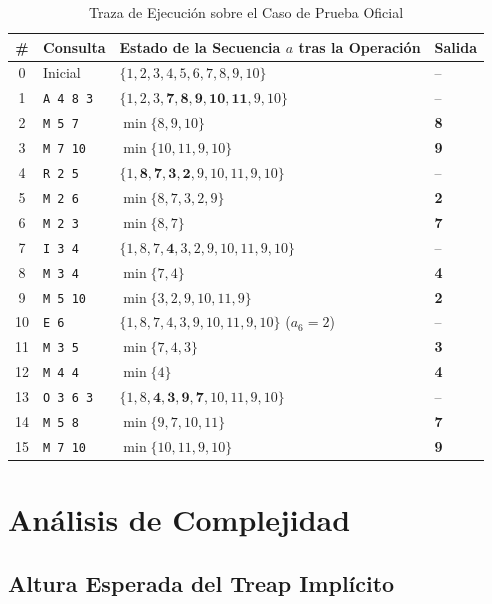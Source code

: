 \documentclass[journal,10pt,a4paper]{IEEEtran}
\begin{document}
\begin{table}[htbp]
\centering
\caption{Traza de Ejecución sobre el Caso de Prueba Oficial}
\label{tab:traza}
\scriptsize
\setlength{\tabcolsep}{2.5pt}
\begin{tabular}{clll}
\toprule
\textbf{\#} & \textbf{Consulta} & \textbf{Estado de la Secuencia $a$ tras la Operación} & \textbf{Salida} \\
\midrule
0 & Inicial & $\{1, 2, 3, 4, 5, 6, 7, 8, 9, 10\}$ & -- \\
1 & \texttt{A 4 8 3} & $\{1, 2, 3, \mathbf{7, 8, 9, 10, 11}, 9, 10\}$ & -- \\
2 & \texttt{M 5 7} & $\min\{8, 9, 10\}$ & \textbf{8} \\
3 & \texttt{M 7 10} & $\min\{10, 11, 9, 10\}$ & \textbf{9} \\
4 & \texttt{R 2 5} & $\{1, \mathbf{8, 7, 3, 2}, 9, 10, 11, 9, 10\}$ & -- \\
5 & \texttt{M 2 6} & $\min\{8, 7, 3, 2, 9\}$ & \textbf{2} \\
6 & \texttt{M 2 3} & $\min\{8, 7\}$ & \textbf{7} \\
7 & \texttt{I 3 4} & $\{1, 8, 7, \mathbf{4}, 3, 2, 9, 10, 11, 9, 10\}$ & -- \\
8 & \texttt{M 3 4} & $\min\{7, 4\}$ & \textbf{4} \\
9 & \texttt{M 5 10} & $\min\{3, 2, 9, 10, 11, 9\}$ & \textbf{2} \\
10 & \texttt{E 6} & $\{1, 8, 7, 4, 3, 9, 10, 11, 9, 10\}$ ($a_6=2$) & -- \\
11 & \texttt{M 3 5} & $\min\{7, 4, 3\}$ & \textbf{3} \\
12 & \texttt{M 4 4} & $\min\{4\}$ & \textbf{4} \\
13 & \texttt{O 3 6 3} & $\{1, 8, \mathbf{4, 3, 9, 7}, 10, 11, 9, 10\}$ & -- \\
14 & \texttt{M 5 8} & $\min\{9, 7, 10, 11\}$ & \textbf{7} \\
15 & \texttt{M 7 10} & $\min\{10, 11, 9, 10\}$ & \textbf{9} \\
\bottomrule
\end{tabular}
\end{table}

\section{Análisis de Complejidad}

\subsection{Altura Esperada del Treap Implícito}
\end{document}

